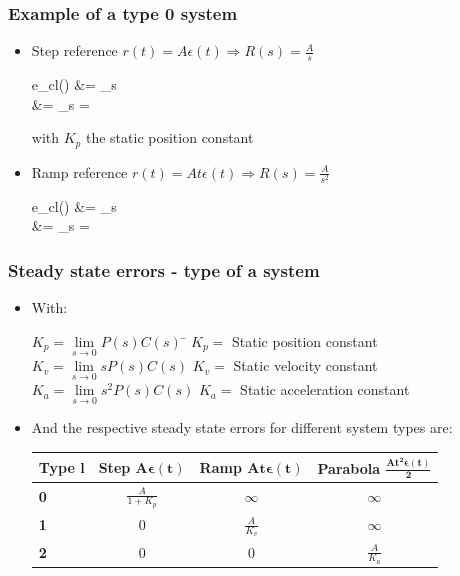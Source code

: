 \begin{frame}
	\frametitle{Example of a type 0 system}
	\begin{itemize}
		\item Step reference $r(t) = A \epsilon (t) \Rightarrow R(s) = \frac{A}{s}$
		\begin{flalign*}
			e_{cl}(\infty) &= \lim\limits_{s }   \\
			&= \lim\limits_{s } 
			= 
		\end{flalign*}
		with $K_p$ the static position constant
		\item Ramp reference $r(t) = At \epsilon (t) \Rightarrow R(s) = \frac{A}{s^2}$
		\begin{flalign*}
			e_{cl}(\infty) &= \lim\limits_{s }  \frac{A}{s^2} \\
			&= \lim\limits_{s }  = \infty
		\end{flalign*}
	\end{itemize}
\end{frame}	

\begin{frame}
	\frametitle{Steady state errors - type of a system}
	\begin{itemize}
		\item With:
			\begin{tabbing}
			$K_p = \lim\limits_{s \rightarrow 0} P(s)C(s)$ 
			\hspace{2em} \= $K_p = $ Static position constant \\
			$K_v = \lim\limits_{s \rightarrow 0}s P(s)C(s)$ \> $K_v = $ Static velocity constant \\
			$K_a = \lim\limits_{s \rightarrow 0}s^2 P(s)C(s)$ \> $K_a = $ Static acceleration constant
			\end{tabbing}
		\item And the respective steady state errors for different system types are:
		\begin{tabular}{|l|c|c|c|}
			\hline \textbf{Type} $\mathbf{l}$ & \textbf{Step} $\mathbf{A \boldsymbol{\epsilon} (t)}$ & \textbf{Ramp} $\mathbf{At \boldsymbol{\epsilon} (t)}$ & \textbf{Parabola} $\mathbf{\frac{At^2 \boldsymbol{\epsilon} (t)}{2}}$ \\ 
			\hline \textbf{0} & $\frac{A}{1 + K_p}$ & $\infty$ & $\infty$ \\ 
			\hline \textbf{1} & 0 & $\frac{A}{K_v}$ & $\infty$ \\ 
			\hline \textbf{2} & 0 & 0 & $\frac{A}{K_a}$ \\ 
			\hline 
		\end{tabular} 
	\end{itemize}
\end{frame}


